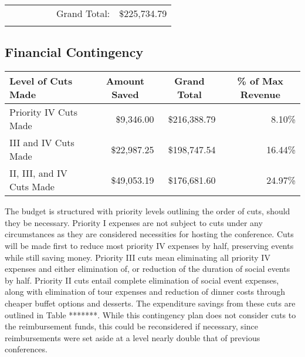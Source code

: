 \begin{tabular}{|clcrccccr|}
     &                           &                           &                           &                           &\multicolumn{3}{r}{Grand Total:}                                                  & $\$$225,734.79           \\
     &                           &                           &                           &                           &                          &                           &                           &                          \\ \hline
\end{tabular}

\subsection{Financial Contingency}


\begin{tabular}{lrrr}
  \hline\hline
  \multicolumn{1}{l}{Level of Cuts Made} & \multicolumn{1}{c}{Amount Saved} & \multicolumn{1}{c}{Grand Total} & \multicolumn{1}{c}{\% of Max Revenue} \\ \hline\hline 
  Priority IV Cuts Made & $\$$9,346.00 & $\$$216,388.79 & 8.10\% \\
  III and IV Cuts Made & $\$$22,987.25 &$\$$198,747.54 & 16.44\% \\
  II, III, and IV Cuts Made & $\$$49,053.19 & $\$$176,681.60 & 24.97\% \\
\end{tabular}

The budget is structured with priority levels outlining the order of cuts, should they be necessary. Priority I expenses are not subject to cuts under any circumstances as they are considered necessities for hosting the conference. Cuts will be made first to reduce most priority IV expenses by half, preserving events while still saving money. Priority III cuts mean eliminating all priority IV expenses and either elimination of, or reduction of the duration of social events by half. Priority II cuts entail complete elimination of social event expenses, along with elimination of tour expenses and reduction of dinner costs through cheaper buffet options and desserts. The expenditure savings from these cuts are outlined in Table *******. While this contingency plan does not consider cuts to the reimbursement funds, this could be reconsidered if necessary, since reimbursements were set aside at a level nearly double that of previous conferences. \\

